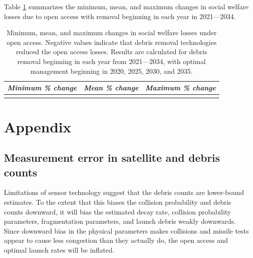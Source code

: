 \documentclass[12pt]{article}
\begin{document}
Table \ref{coi_removal_sum} summarizes the minimum, mean, and maximum changes in social welfare losses due to open access with removal beginning in each year in 2021---2034.

\begin{table}[H]
	\centering
	\begin{tabular}{|l|l|l|}
		\hline
		\textit{Minimum \% change} & \textit{Mean \% change} & \textit{Maximum \% change} \\ \hline
		&                         &                            \\ \hline
	\end{tabular}
	\caption[Minimum, mean, and maximum changes from debris removal on open access losses]{Minimum, mean, and maximum changes in social welfare losses under open access. Negative values indicate that debris removal technologies reduced the open access losses. Results are calculated for debris removal beginning in each year from 2021---2034, with optimal management beginning in 2020, 2025, 2030, and 2035.}
	\label{coi_removal_sum}
\end{table}

\newpage

{
	\setlength{\bibsep}{3pt}
	
	
}

\newpage

\section{Appendix}

\subsection{Measurement error in satellite and debris counts}
\label{physicsMeasurementError}

Limitations of sensor technology suggest that the debris counts are lower-bound estimates. To the extent that this biases the collision probability and debris counts downward, it will bias the estimated decay rate, collision probability parameters, fragmentation parameters, and launch debris weakly downwards. Since downward bias in the physical parameters makes collisions and missile tests appear to cause less congestion than they actually do, the open access and optimal launch rates will be inflated.\\
\end{document}
